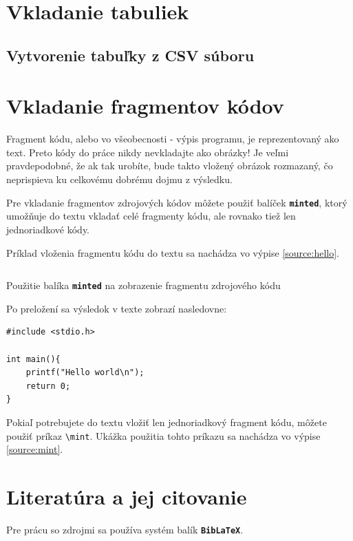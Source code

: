 \section{Vkladanie tabuliek}

\subsection{Vytvorenie tabuľky z CSV súboru}

\section{Vkladanie fragmentov kódov}

Fragment kódu, alebo vo všeobecnosti - výpis programu, je reprezentovaný ako text. Preto kódy do práce nikdy nevkladajte ako obrázky! Je veľmi pravdepodobné, že ak tak urobíte, bude takto vložený obrázok rozmazaný, čo neprispieva ku celkovému dobrému dojmu z výsledku.

Pre vkladanie fragmentov zdrojových kódov môžete použiť balíček {\bf\tt minted}, ktorý umožňuje do textu vkladať celé fragmenty kódu, ale rovnako tiež len jednoriadkové kódy. 

Príklad vloženia fragmentu kódu do textu sa nachádza vo výpise \ref{source:hello}.


\begin{listing}[ht]
\inputminted[frame=lines]{latex}{examples/hello.world.tex}
\caption{Použitie balíka {\tt\bf minted} na zobrazenie fragmentu zdrojového kódu}\label{source:hello}
\end{listing}

Po preložení sa výsledok v texte zobrazí nasledovne:

\begin{verbatim}
#include <stdio.h>

int main(){
    printf("Hello world\n");
    return 0;
}
\end{verbatim}

Pokiaľ potrebujete do textu vložiť len jednoriadkový fragment kódu, môžete použiť príkaz {\tt\textbackslash{mint}}. Ukážka použitia tohto príkazu sa nachádza vo výpise \ref{source:mint}.


\section{Literatúra a jej citovanie}

Pre prácu so zdrojmi sa používa systém balík {\tt \bf BibLaTeX}.
\inputminted{latex}{chapters/bibliography.bib}
